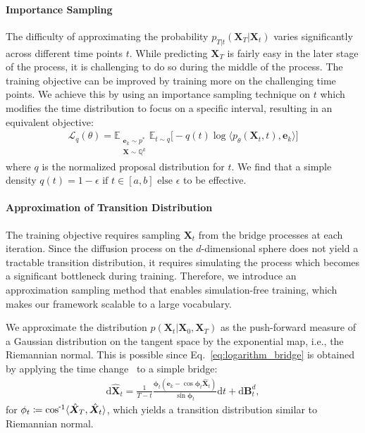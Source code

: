 \paragraph{Importance Sampling}
The difficulty of approximating the probability $p_{T|t}(\bm{X}_T|\bm{X}_t)$ varies significantly across different time points $t$.
While predicting $\bm{X}_T$ is fairly easy in the later stage of the process, it is challenging to do so during the middle of the process.
The training objective can be improved by training more on the challenging time points. 
We achieve this by using an importance sampling technique on $t$ which modifies the time distribution to focus on a specific interval, resulting in an equivalent objective:
\begin{align}
    \mathcal{L}_{q}(\theta) = 
    \mathbb{E}_{\substack{\bm{e}_k\sim p^{*} \\ \bm{X}\sim\mathbb{Q}^{k}}}
    \mathbb{E}_{t\sim q} 
    \Big[ -q(t) \log \big\langle p_{\theta}(\bm{X}_t,t), \bm{e}_k \big\rangle \Big]
\label{eq:importance_mixture_objective} 
\end{align}
where $q$ is the normalized proposal distribution for $t$. We find that a simple density $q(t) = 1-\epsilon \text{ if } t\in[a,b] \text{ else }\epsilon$ to be effective.



\paragraph{Approximation of Transition Distribution}
The training objective requires sampling $\bm{X}_t$ from the bridge processes at each iteration. 
Since the diffusion process on the $d$-dimensional sphere does not yield a tractable transition distribution, it requires simulating the process which becomes a significant bottleneck during training.
Therefore, we introduce an approximation sampling method that enables simulation-free training, which makes our framework scalable to a large vocabulary.


We approximate the distribution $p(\bm{X}_t|\bm{X}_0,\bm{X}_T)$ as the push-forward measure of a Gaussian distribution on the tangent space by the exponential map, i.e., the Riemannian normal.
This is possible since Eq.~\eqref{eq:logarithm_bridge} is obtained by applying the time change~\citep{oksendal2003sde} to a simple bridge:
\begin{align}
    \mathrm{d}\hat{\bm{X}}_t = \frac{1}{T-t} \frac{\bm{\phi}_t(\bm{e}_k - \cos\bm{\phi}_t \hat{\bm{X}}_t)}{\sin\bm{\phi}_t} \mathrm{d}t + \mathrm{d}\mathbf{B}^{d}_t, 
\end{align}
for $\phi_t\coloneqq \invcos\langle\hat{\bm{X}}_T,\hat{\bm{X}}_t\rangle$, which yields a transition distribution similar to Riemannian normal.


